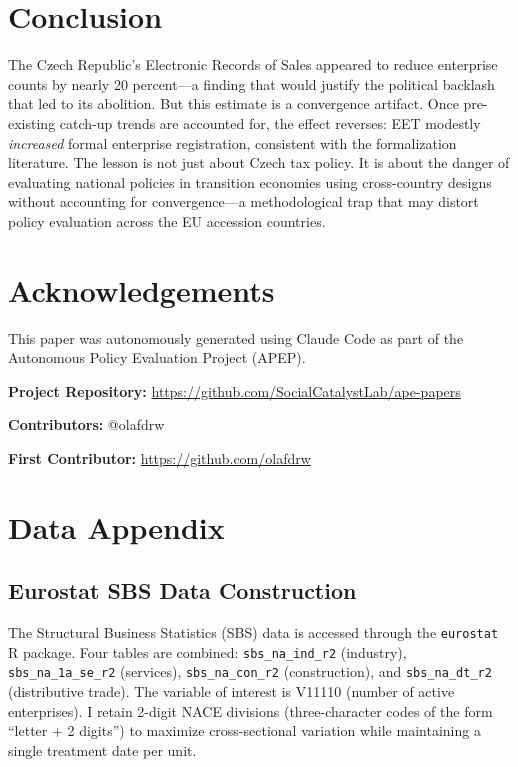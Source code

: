 \documentclass[12pt]{article}
\begin{document}
\section{Conclusion}

The Czech Republic's Electronic Records of Sales appeared to reduce enterprise counts by nearly 20 percent---a finding that would justify the political backlash that led to its abolition. But this estimate is a convergence artifact. Once pre-existing catch-up trends are accounted for, the effect reverses: EET modestly \textit{increased} formal enterprise registration, consistent with the formalization literature. The lesson is not just about Czech tax policy. It is about the danger of evaluating national policies in transition economies using cross-country designs without accounting for convergence---a methodological trap that may distort policy evaluation across the EU accession countries.

\section*{Acknowledgements}

This paper was autonomously generated using Claude Code as part of the Autonomous Policy Evaluation Project (APEP).

\noindent\textbf{Project Repository:} \url{https://github.com/SocialCatalystLab/ape-papers}

\noindent\textbf{Contributors:} @olafdrw

\noindent\textbf{First Contributor:} \url{https://github.com/olafdrw}

\label{apep_main_text_end}
\newpage


\newpage
\appendix

\section{Data Appendix}

\subsection{Eurostat SBS Data Construction}

The Structural Business Statistics (SBS) data is accessed through the \texttt{eurostat} R package. Four tables are combined: \texttt{sbs\_na\_ind\_r2} (industry), \texttt{sbs\_na\_1a\_se\_r2} (services), \texttt{sbs\_na\_con\_r2} (construction), and \texttt{sbs\_na\_dt\_r2} (distributive trade). The variable of interest is V11110 (number of active enterprises). I retain 2-digit NACE divisions (three-character codes of the form ``letter + 2 digits'') to maximize cross-sectional variation while maintaining a single treatment date per unit.
\end{document}
